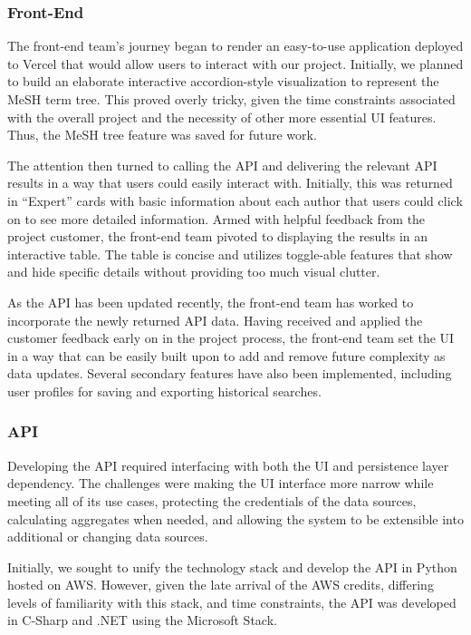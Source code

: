 \subsubsection{Front-End}

The front-end team's journey began to render an easy-to-use application deployed to Vercel that would allow users to interact with our project. Initially, we planned to build an elaborate interactive accordion-style visualization to represent the MeSH term tree. This proved overly tricky, given the time constraints associated with the overall project and the necessity of other more essential UI features. Thus, the MeSH tree feature was saved for future work. 

The attention then turned to calling the API and delivering the relevant API results in a way that users could easily interact with. Initially, this was returned in ``Expert'' cards with basic information about each author that users could click on to see more detailed information. Armed with helpful feedback from the project customer, the front-end team pivoted to displaying the results in an interactive table. The table is concise and utilizes toggle-able features that show and hide specific details without providing too much visual clutter.  

As the API has been updated recently, the front-end team has worked to incorporate the newly returned API data. Having received and applied the customer feedback early on in the project process, the front-end team set the UI in a way that can be easily built upon to add and remove future complexity as data updates. Several secondary features have also been implemented, including user profiles for saving and exporting historical searches. 

\subsubsection{API}

Developing the API required interfacing with both the UI and persistence layer dependency. The challenges were making the UI interface more narrow while meeting all of its use cases, protecting the credentials of the data sources, calculating aggregates when needed, and allowing the system to be extensible into additional or changing data sources. 

Initially, we sought to unify the technology stack and develop the API in Python hosted on AWS. However, given the late arrival of the AWS credits, differing levels of familiarity with this stack, and time constraints, the API was developed in C-Sharp and .NET using the Microsoft Stack. 

